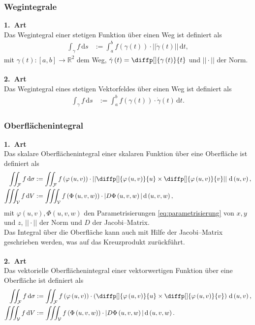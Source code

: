 \documentclass[a4paper,12pt]{article}
\newcommand{\td}{\,\text{d}}
\numberwithin{equation}{section}
\begin{document}
\subsubsection{Wegintegrale}
\textbf{1.\ Art}\\ 
Das Wegintegral einer stetigen Funktion über einen Weg ist definiert als
\begin{align} 
        \int_{\gamma }^{}f\td s&:=\int_{a}^{b}f\left(\gamma \left(t\right)\right)\cdot ||\dot{\gamma }\left(t\right)||\td t
,\end{align} 
mit $\gamma \left(t\right):\left[a,b\right]\rightarrow \mathbb{R}^2$ dem Weg, $\dot{\gamma }\left(t\right)=\diffp[]{\gamma \left(t\right)}{t}$ und $||\cdot ||$ der Norm.
\\\hfill\\\textbf{2.\ Art}\\ 
Das Wegintegral eines stetigen Vektorfeldes über einen Weg ist definiert als
\begin{align} 
        \int_{\gamma }^{}f\td s&:=\int_{a}^{b}f\left(\gamma \left(t\right)\right)\cdot \dot{\gamma }\left(t\right)\td t
.\end{align} 

\subsubsection{Oberflächenintegral}
\textbf{1.\ Art}\\ 
Das skalare Oberflächenintegral einer skalaren Funktion über eine Oberfläche ist definiert als
\begin{align} 
        \iint_{\mathcal{F}}^{}f\td \sigma &:=\iint_{\mathcal{F}}^{}f\left(\varphi \left(u,v\right)\right)\cdot \left|\left|\diffp[]{\varphi \left(u,v\right)}{u}\times \diffp[]{\varphi \left(u,v\right)}{v}\right|\right| \td \left(u,v\right),\\
        \iiint_{\mathcal{V}}^{}f\td V&:=\iiint_{\mathcal{V}}^{}f\left(\Phi \left(u,v,w\right)\right)\cdot |D\Phi \left(u,v,w\right)|\td \left(u,v,w\right)
,\end{align} 
mit $\varphi \left(u,v\right),\Phi \left(u,v,w\right)$ den Parametrisierungen \eqref{eq:parametrisierung} von $x,y$ und $z$, $||\cdot || $ der Norm und $D$ der Jacobi--Matrix.\\\indent
Das Integral über die Oberfläche kann auch mit Hilfe der Jacobi--Matrix geschrieben werden, was auf das Kreuzprodukt zurückführt.
\\\hfill\\\textbf{2.\ Art}\\ 
Das vektorielle Oberflächenintegral einer vektorwertigen Funktion über eine Oberfläche ist definiert als
\begin{align} 
        \iint_{\mathcal{F}}^{}f\td \sigma &:=\iint_{\mathcal{F}}^{}f\left(\varphi \left(u,v\right)\right)\cdot \left(\diffp[]{\varphi \left(u,v\right)}{u}\times \diffp[]{\varphi \left(u,v\right)}{v}\right)\td \left(u,v\right),\\
        \iiint_{\mathcal{V}}^{}f\td V&:=\iiint_{\mathcal{V}}^{}f\left(\Phi \left(u,v,w\right)\right)\cdot |D\Phi \left(u,v,w\right)|\td \left(u,v,w\right)
.\end{align} 
\end{document}
